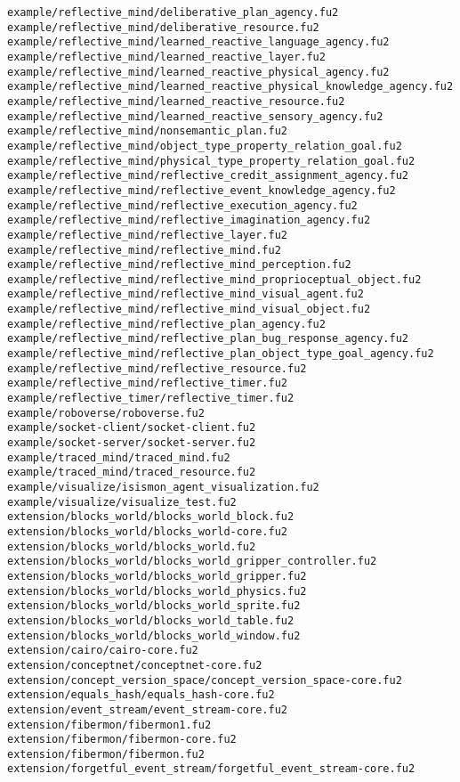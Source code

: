\begin{lstlisting}
example/reflective_mind/deliberative_plan_agency.fu2
example/reflective_mind/deliberative_resource.fu2
example/reflective_mind/learned_reactive_language_agency.fu2
example/reflective_mind/learned_reactive_layer.fu2
example/reflective_mind/learned_reactive_physical_agency.fu2
example/reflective_mind/learned_reactive_physical_knowledge_agency.fu2
example/reflective_mind/learned_reactive_resource.fu2
example/reflective_mind/learned_reactive_sensory_agency.fu2
example/reflective_mind/nonsemantic_plan.fu2
example/reflective_mind/object_type_property_relation_goal.fu2
example/reflective_mind/physical_type_property_relation_goal.fu2
example/reflective_mind/reflective_credit_assignment_agency.fu2
example/reflective_mind/reflective_event_knowledge_agency.fu2
example/reflective_mind/reflective_execution_agency.fu2
example/reflective_mind/reflective_imagination_agency.fu2
example/reflective_mind/reflective_layer.fu2
example/reflective_mind/reflective_mind.fu2
example/reflective_mind/reflective_mind_perception.fu2
example/reflective_mind/reflective_mind_proprioceptual_object.fu2
example/reflective_mind/reflective_mind_visual_agent.fu2
example/reflective_mind/reflective_mind_visual_object.fu2
example/reflective_mind/reflective_plan_agency.fu2
example/reflective_mind/reflective_plan_bug_response_agency.fu2
example/reflective_mind/reflective_plan_object_type_goal_agency.fu2
example/reflective_mind/reflective_resource.fu2
example/reflective_mind/reflective_timer.fu2
example/reflective_timer/reflective_timer.fu2
example/roboverse/roboverse.fu2
example/socket-client/socket-client.fu2
example/socket-server/socket-server.fu2
example/traced_mind/traced_mind.fu2
example/traced_mind/traced_resource.fu2
example/visualize/isismon_agent_visualization.fu2
example/visualize/visualize_test.fu2
extension/blocks_world/blocks_world_block.fu2
extension/blocks_world/blocks_world-core.fu2
extension/blocks_world/blocks_world.fu2
extension/blocks_world/blocks_world_gripper_controller.fu2
extension/blocks_world/blocks_world_gripper.fu2
extension/blocks_world/blocks_world_physics.fu2
extension/blocks_world/blocks_world_sprite.fu2
extension/blocks_world/blocks_world_table.fu2
extension/blocks_world/blocks_world_window.fu2
extension/cairo/cairo-core.fu2
extension/conceptnet/conceptnet-core.fu2
extension/concept_version_space/concept_version_space-core.fu2
extension/equals_hash/equals_hash-core.fu2
extension/event_stream/event_stream-core.fu2
extension/fibermon/fibermon1.fu2
extension/fibermon/fibermon-core.fu2
extension/fibermon/fibermon.fu2
extension/forgetful_event_stream/forgetful_event_stream-core.fu2

\end{lstlisting}
